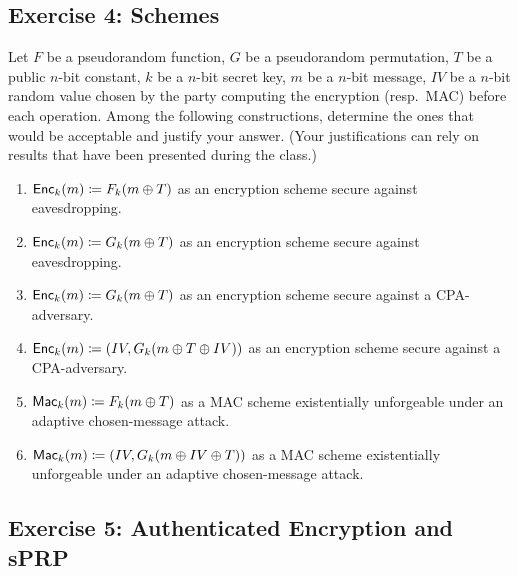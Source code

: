 \documentclass[12pt]{article}
\begin{document}
\subsection{Exercise 4: Schemes}
Let $F$ be a pseudorandom function, $G$ be a pseudorandom permutation, $T$ be a public $n$-bit constant, $k$ be a $n$-bit secret key, $m$ be a $n$-bit message, $IV$ be a $n$-bit random value chosen by the party computing the encryption (resp.~MAC) before each operation. Among the following constructions, determine the ones that would be acceptable and justify your answer. (Your justifications can rely on results that have been presented during the class.)

\begin{enumerate}
	\item $\operatorname{\mathsf{Enc}}_k(m) \coloneqq F_k(m \oplus T)$ as an encryption scheme secure against
	eavesdropping.

	\item $\operatorname{\mathsf{Enc}}_k(m) \coloneqq G_k(m \oplus T)$ as an encryption scheme secure against eavesdropping.

	\item $\operatorname{\mathsf{Enc}}_k(m) \coloneqq G_k(m \oplus T)$ as an encryption scheme secure against a CPA-adversary.

	\item $\operatorname{\mathsf{Enc}}_k(m) \coloneqq (IV,G_k(m \oplus T \oplus IV))$ as an encryption scheme secure against a CPA-adversary.

	\item $\operatorname{\mathsf{Mac}}_k(m) \coloneqq F_k(m \oplus T)$ as a MAC scheme existentially unforgeable under an
	adaptive chosen-message attack.

	\item $\operatorname{\mathsf{Mac}}_k(m) \coloneqq (IV,G_k(m\oplus IV \oplus T))$ as a MAC scheme
	existentially unforgeable under an adaptive chosen-message attack.
\end{enumerate}




\subsection{Exercise 5: Authenticated Encryption and sPRP}
\end{document}
